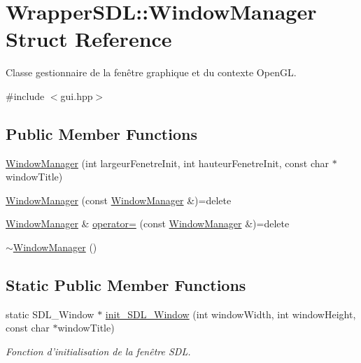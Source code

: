 \hypertarget{struct_wrapper_s_d_l_1_1_window_manager}{\section{Wrapper\+S\+D\+L\+:\+:Window\+Manager Struct Reference}
\label{struct_wrapper_s_d_l_1_1_window_manager}
}


Classe gestionnaire de la fenêtre graphique et du contexte Open\+G\+L.  




{\ttfamily \#include $<$gui.\+hpp$>$}

\subsection*{Public Member Functions}
\begin{DoxyCompactItemize}
\item 
\hyperlink{struct_wrapper_s_d_l_1_1_window_manager_ae02139a68c12d56782e1293c3c0f859a}{Window\+Manager} (int largeur\+Fenetre\+Init, int hauteur\+Fenetre\+Init, const char $\ast$window\+Title)
\item 
\hyperlink{struct_wrapper_s_d_l_1_1_window_manager_aecb08757241e2d17ac5381f9596851c3}{Window\+Manager} (const \hyperlink{struct_wrapper_s_d_l_1_1_window_manager}{Window\+Manager} \&)=delete
\item 
\hyperlink{struct_wrapper_s_d_l_1_1_window_manager}{Window\+Manager} \& \hyperlink{struct_wrapper_s_d_l_1_1_window_manager_ad6084e2189751023bfc18927891dedad}{operator=} (const \hyperlink{struct_wrapper_s_d_l_1_1_window_manager}{Window\+Manager} \&)=delete
\item 
\hyperlink{struct_wrapper_s_d_l_1_1_window_manager_a7d586fdd6fffdaa093efe52a31a4c9f6}{$\sim$\+Window\+Manager} ()
\end{DoxyCompactItemize}
\subsection*{Static Public Member Functions}
\begin{DoxyCompactItemize}
\item 
static S\+D\+L\+\_\+\+Window $\ast$ \hyperlink{struct_wrapper_s_d_l_1_1_window_manager_a04c1b0e8c5c9b685863f60d2d033fcb5}{init\+\_\+\+S\+D\+L\+\_\+\+Window} (int window\+Width, int window\+Height, const char $\ast$window\+Title)
\begin{DoxyCompactList}\small\item\em Fonction d'initialisation de la fenêtre S\+D\+L. \end{DoxyCompactList}\end{DoxyCompactItemize}
